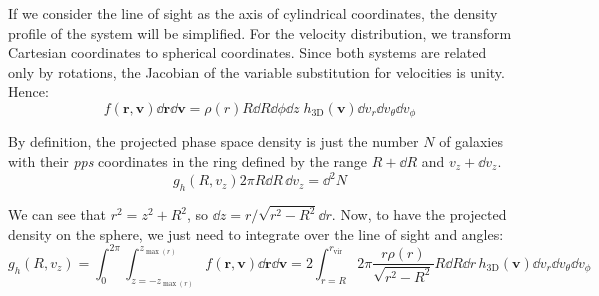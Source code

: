 If we consider the line of sight as the axis of cylindrical coordinates, the
density profile of the system will be simplified. For the velocity
distribution, we transform Cartesian coordinates to spherical coordinates.
Since both systems are related only by rotations, the Jacobian of the variable
substitution for velocities is unity. Hence:
%
\begin{equation}
    f\left(\textbf{r},\textbf{v}\right)\dd\textbf{r}\dd\textbf{v}=
    \rho\left(r\right)R\dd{R}\dd\phi\dd{z}\;
    h_\mathrm{3D}\left(\textbf{v}\right)
    \dd{v_r}\dd{v_\theta}\dd{v_\phi}
\end{equation}

By definition, the projected phase space density is just the number $N$ of
galaxies with their \emph{pps} coordinates in the ring defined by the range
$R+\dd R$ and $v_z+\dd v_z$.
%
\begin{equation}
    g_h \left(R, v_z\right)2\pi R \dd R\, \dd v_z = \dd^2 N
\end{equation}

We can see that $r^2=z^2+R^2$, so $\dd{z}=r/\sqrt{r^2-R^2}\dd{r}$.
Now, to have the projected density on the sphere, we just need to integrate
over the line of sight and angles:
%
\begin{equation}
    \label{eq:intfunc}
    g_h \left(R, v_z\right) =
    \int_0^{2\pi}\int_{z=-z_{\max\left(r\right)}}^{z_{\max\left(r\right)}}
    f\left(\textbf{r},\textbf{v}\right)\dd\textbf{r}
    \dd{\textbf{v}}=2\int_{r=R}^{r_{\mathrm{vir}}}2\pi
    \frac{r\rho\left(r\right)}{\sqrt{r^2-R^2}}R\dd R\dd r\,
    h_\mathrm{3D}\left(\textbf{v}\right)\dd v_r\dd v_\theta\dd v_\phi
\end{equation}

